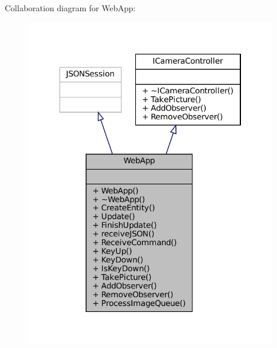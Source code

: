 Collaboration diagram for Web\+App\+:\nopagebreak
\begin{figure}[H]
\begin{center}
\leavevmode
\includegraphics[width=310pt]{classWebApp__coll__graph}
\end{center}
\end{figure}
